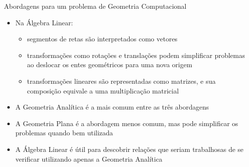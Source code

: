 \begin{frame}[fragile]{Abordagens para um problema de Geometria Computacional}

    \begin{itemize}
 
        \item Na Álgebra Linear: 
        \pause
    
        \begin{itemize}
            \item segmentos de retas são interpretados como vetores
        \pause
            \item transformações como rotações e translações podem simplificar problemas ao deslocar os entes geométricos para uma nova origem
        \pause
            \item transformações lineares são representadas como matrizes, e sua composição equivale a uma multiplicação matricial
        \pause
        \end{itemize}

        \item A Geometria Analítica é a mais comum entre as três abordagens
        \pause

        \item A Geometria Plana é a abordagem menos comum, mas pode simplificar os problemas quando bem utilizada
        \pause
        \item A Álgebra Linear é útil para descobrir relações que seriam trabalhosas de se verificar utilizando apenas a Geometria Analítica
    \end{itemize}

\end{frame}
